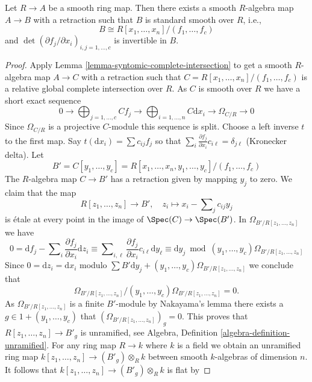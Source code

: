 \begin{lemma}
\label{lemma-smooth-standard-smooth}
Let $R \to A$ be a smooth ring map. Then there exists a smooth $R$-algebra
map $A \to B$ with a retraction such that $B$ is standard smooth over
$R$, i.e.,
$$
B \cong R[x_1, \ldots, x_n]/(f_1, \ldots, f_c)
$$
and $\det(\partial f_j/\partial x_i)_{i, j = 1, \ldots, c}$
is invertible in $B$.
\end{lemma}

\begin{proof}
Apply Lemma \ref{lemma-syntomic-complete-intersection}
to get a smooth $R$-algebra map $A \to C$ with a retraction such that
$C = R[x_1, \ldots, x_n]/(f_1, \ldots, f_c)$
is a relative global complete intersection over $R$. As $C$ is smooth
over $R$ we have a short exact sequence
$$
0 \to
\bigoplus\nolimits_{j = 1, \ldots, c} C f_j \to
\bigoplus\nolimits_{i = 1, \ldots, n} C\text{d}x_i \to
\Omega_{C/R} \to 0
$$
Since $\Omega_{C/R}$ is a projective $C$-module this sequence is split.
Choose a left inverse $t$ to the first map. Say
$t(\text{d}x_i) = \sum c_{ij} f_j$
so that $\sum_i \frac{\partial f_j}{\partial x_i} c_{i\ell} = \delta_{j\ell}$
(Kronecker delta). Let
$$
B' = C[y_1, \ldots, y_c] =
R[x_1, \ldots, x_n, y_1, \ldots, y_c]/(f_1, \ldots, f_c)
$$
The $R$-algebra map $C \to B'$ has a retraction given by mapping $y_j$ to zero.
We claim that the map
$$
R[z_1, \ldots, z_n] \longrightarrow B',\quad
z_i \longmapsto x_i - \sum\nolimits_j c_{ij} y_j
$$
is \'etale at every point in the image of $\Spec(C) \to \Spec(B')$.
In $\Omega_{B'/R[z_1, \ldots, z_n]}$ we have
$$
0 =
\text{d}f_j - \sum\nolimits_i \frac{\partial f_j}{\partial x_i} \text{d}z_i
\equiv
\sum\nolimits_{i, \ell}
\frac{\partial f_j}{\partial x_i} c_{i\ell} \text{d}y_\ell
\equiv
\text{d}y_j \bmod (y_1, \ldots, y_c)\Omega_{B'/R[z_1, \ldots, z_n]}
$$
Since $0 = \text{d}z_i = \text{d}x_i$ modulo
$\sum B'\text{d}y_j + (y_1, \ldots, y_c)\Omega_{B'/R[z_1, \ldots, z_n]}$
we conclude that
$$
\Omega_{B'/R[z_1, \ldots, z_n]}/
(y_1, \ldots, y_c)\Omega_{B'/R[z_1, \ldots, z_n]} = 0.
$$
As $\Omega_{B'/R[z_1, \ldots, z_n]}$ is a finite $B'$-module
by Nakayama's lemma there exists a $g \in 1 + (y_1, \ldots, y_c)$
that $(\Omega_{B'/R[z_1, \ldots, z_n]})_g = 0$. This proves that
$R[z_1, \ldots, z_n] \to B'_g$ is unramified, see
Algebra, Definition \ref{algebra-definition-unramified}.
For any ring map $R \to k$ where $k$ is a field we obtain an
unramified ring map $k[z_1, \ldots, z_n] \to (B'_g) \otimes_R k$
between smooth $k$-algebras of dimension $n$. It follows that
$k[z_1, \ldots, z_n] \to (B'_g) \otimes_R k$ is flat by

\end{proof}

